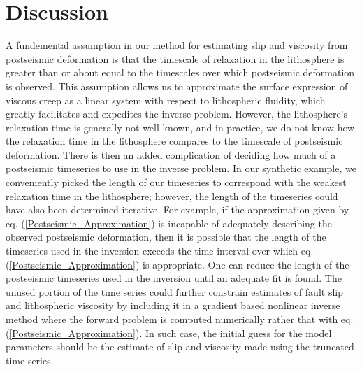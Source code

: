 \documentclass[extra]{gji}
\begin{document}

\section{Discussion}

A fundemental assumption in our method for estimating slip and
viscosity from postseismic deformation is that the timescale of
relaxation in the lithosphere is greater than or about equal to the
timescales over which postseismic deformation is observed.  This
assumption allows us to approximate the surface expression of viscous
creep as a linear system with respect to lithospheric fluidity, which
greatly facilitates and expedites the inverse problem.  However, the
lithosphere's relaxation time is generally not well known, and in
practice, we do not know how the relaxation time in the lithosphere
compares to the timescale of postseismic deformation.  There is then
an added complication of deciding how much of a postseismic timeseries
to use in the inverse problem.  In our synthetic example, we
conveniently picked the length of our timeseries to correspond with
the weakest relaxation time in the lithosphere; however, the length of
the timeseries could have also been determined iterative.  For
example, if the approximation given by
eq. (\ref{Postseismic_Approximation}) is incapable of adequately
describing the observed postseismic deformation, then it is possible
that the length of the timeseries used in the inversion exceeds the
time interval over which eq. (\ref{Postseismic_Approximation}) is
appropriate.  One can reduce the length of the postseismic timeseries
used in the inversion until an adequate fit is found. The unused
portion of the time series could further constrain estimates of fault
slip and lithospheric viscosity by including it in a gradient based
nonlinear inverse method where the forward problem is computed
numerically rather that with eq. (\ref{Postseismic_Approximation}). In
such case, the initial guess for the model parameters should be the
estimate of slip and viscosity made using the truncated time series.
\end{document}
